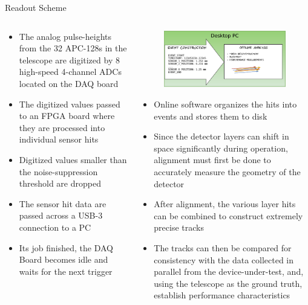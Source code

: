 \documentclass[final]{beamer}
\newlength{\onecolwide}
\newlength{\readoutimgheight}
\newlength{\readoutimgwidth}
\begin{document}
\begin{frame}[t]
\begin{exampleblock}{Readout Scheme}
\begin{columns}[t]
\begin{column}{\onecolwide}
\begin{figure}
      \end{figure}
      \footnotesize
      \begin{itemize}
      \itemsep0em 
        \item The analog pulse-heights from the 32 APC-128s in the telescope are digitized by 8 high-speed 4-channel ADCs located on the DAQ board
        \item The digitized values passed to an FPGA board where they are processed into individual sensor hits
        \item Digitized values smaller than the noise-suppression threshold are dropped
        \item The sensor hit data are passed across a USB-3 connection to a PC
        \item Its job finished, the DAQ Board becomes idle and waits for the next trigger
      \end{itemize}
    \end{column}
    \begin{column}{\onecolwide}
      \begin{figure}
        \centering
        \includegraphics[height=\readoutimgheight, width=\readoutimgwidth]{figures/Telescope_Data_Flow_Stage_III.pdf}
      \end{figure}
      \footnotesize
      \begin{itemize}
        \itemsep0em 
        \item Online software organizes the hits into events and stores them to disk
        \item Since the detector layers can shift in space significantly during operation, alignment must first be done to accurately measure the geometry of the detector
        \item After alignment, the various layer hits can be combined to construct extremely precise tracks
        \item The tracks can then be compared for consistency with the data collected in parallel from the device-under-test, and, using the telescope as the ground truth, establish performance characteristics
      \end{itemize}
    \end{column}
  \end{columns}
\end{exampleblock}



\end{frame}
\end{document}
